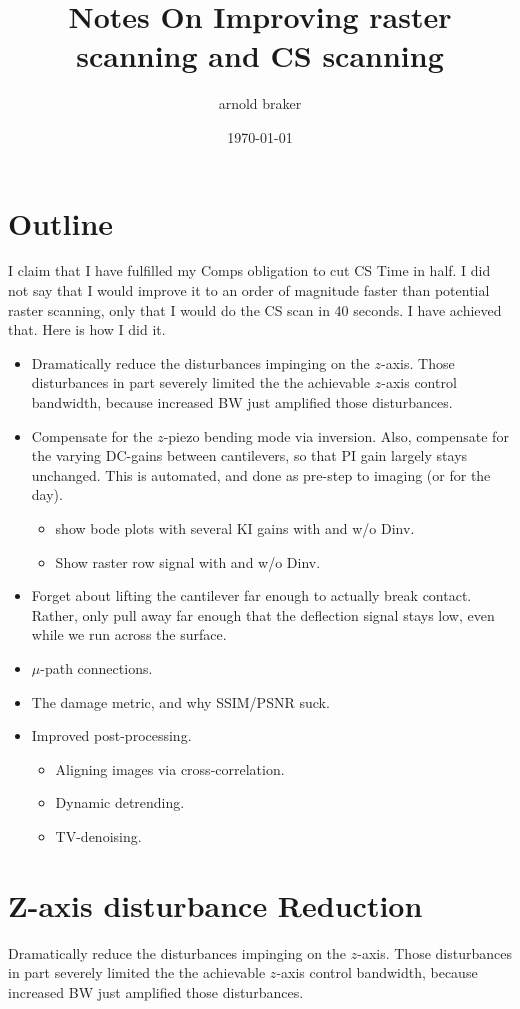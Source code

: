 \documentclass[11pt]{article}
\author{arnold braker}
\date{\today}
\title{Notes On Improving raster scanning and CS scanning}
\begin{document}
\maketitle
\tableofcontents
\section{Outline}
I claim that I have fulfilled my Comps obligation to cut CS Time in half. I did not say that I would improve it to an order of magnitude faster than potential raster scanning, only that I would do the CS scan in 40 seconds. I have achieved that.  Here is how I did it.

\begin{itemize}
\item Dramatically reduce the disturbances impinging on the $z$-axis. Those disturbances in part severely limited the the achievable $z$-axis control bandwidth, because increased BW just amplified those disturbances.
\item Compensate for the $z$-piezo bending mode via inversion. Also, compensate for the varying DC-gains between cantilevers, so that PI gain largely stays unchanged. This is automated, and done as pre-step to imaging (or for the day).
  \begin{itemize}
  \item show bode plots with several KI gains with and w/o Dinv.
  \item Show raster row signal with and w/o Dinv.
  \end{itemize}
\item Forget about lifting the cantilever far enough to actually break contact. Rather, only pull away far enough that the deflection signal stays low, even while we run across the surface.
\item $\mu$-path connections.
\item The damage metric, and why SSIM/PSNR suck.
\item Improved post-processing. 
  \begin{itemize}
  \item Aligning images via cross-correlation.
  \item Dynamic detrending.
  \item TV-denoising.
  \end{itemize}
\end{itemize}

\section{Z-axis disturbance Reduction}
Dramatically reduce the disturbances impinging on the $z$-axis. Those disturbances in part severely limited the the achievable $z$-axis control bandwidth, because increased BW just amplified those disturbances.
\end{document}
